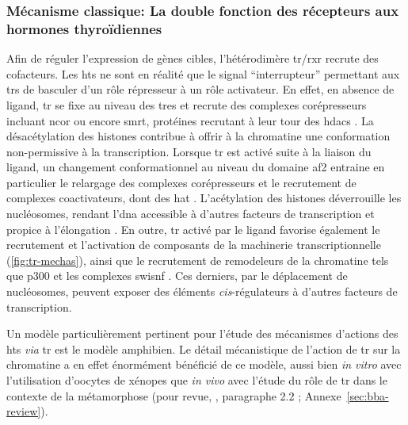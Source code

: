 \documentclass[../main.tex]{subfiles}
\begin{document}
		\subsubsection{Mécanisme classique: La double fonction des récepteurs aux hormones thyroïdiennes}
			Afin de réguler l'expression de gènes cibles, l'hétérodimère \gls{tr}/\gls{rxr} recrute des cofacteurs.
			Les \glspl{ht} ne sont en réalité que le signal ``interrupteur'' permettant aux \glspl{tr} de basculer d'un rôle répresseur à un rôle activateur.
			En effet, en absence de ligand, \gls{tr} se fixe au niveau des \glspl{tre} et recrute des complexes corépresseurs incluant \gls{ncor} ou encore \gls{smrt}, protéines recrutant à leur tour des \glspl{hdac} \citep{Wong1998}.
			La désacétylation des histones contribue à offrir à la chromatine une conformation non-permissive à la transcription.
			Lorsque \gls{tr} est activé suite à la liaison du ligand, un changement conformationnel au niveau du domaine \gls{af2} entraine en particulier le relargage des complexes corépresseurs et le recrutement de complexes coactivateurs, dont des \gls{hat} \citep{Wolffe1997}.
			L'acétylation des histones déverrouille les nucléosomes, rendant l'\gls{dna} accessible à d'autres facteurs de transcription et propice à l'élongation \citep{Wong1997}.
			En outre, \gls{tr} activé par le ligand favorise également le recrutement et l'activation de composants de la machinerie transcriptionnelle (\autoref{fig:tr-mechas}), ainsi que le recrutement de remodeleurs de la chromatine tels que p300 et les complexes \gls{swisnf} \citep{Huang2003,Heimeier2008}.
			Ces derniers, par le déplacement de nucléosomes, peuvent exposer des éléments \textit{cis}-régulateurs à d'autres facteurs de transcription.
			\par
			Un modèle particulièrement pertinent pour l'étude des mécanismes d'actions des \glspl{ht} \textit{via} \gls{tr} est le modèle amphibien.
			Le détail mécanistique de l'action de \gls{tr} sur la chromatine a en effet énormément bénéficié de ce modèle, aussi bien \textit{in vitro} avec l'utilisation d'oocytes de xénopes que \textit{in vivo} avec l'étude du rôle de \gls{tr} dans le contexte de la métamorphose (pour revue, \citealp{Grimaldi2012}, paragraphe 2.2 ; Annexe~\ref{sec:bba-review}).
\end{document}
